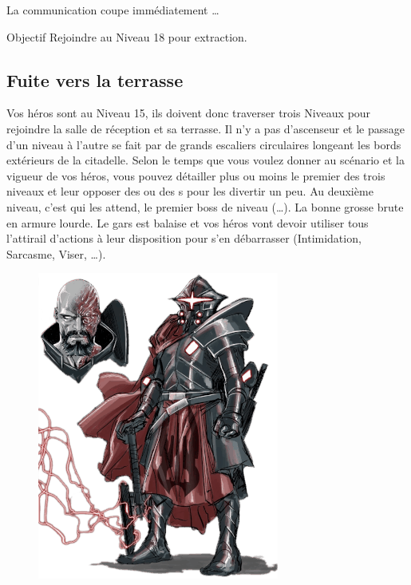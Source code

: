 La communication coupe immédiatement \dots

\begin{paperbox}{Objectif}
Rejoindre  au Niveau 18 pour extraction.
\end{paperbox}

\newpage

\subsection{Fuite vers la terrasse}

Vos héros sont au Niveau 15, ils doivent donc traverser trois Niveaux pour rejoindre la salle de réception et sa terrasse. Il n’y a pas d’ascenseur et le passage d’un niveau à l’autre se fait par de grands escaliers circulaires longeant les bords extérieurs de la citadelle. Selon le temps que vous voulez donner au scénario et la vigueur de vos héros, vous pouvez détailler plus ou moins le premier des trois niveaux et leur opposer des  ou des s pour les divertir un peu.
\bigbreak
Au deuxième niveau, c’est  qui les attend, le premier boss de niveau (\dots). La bonne grosse brute en armure lourde. Le gars est balaise et vos héros vont devoir utiliser tous l’attirail d’actions à leur disposition pour s’en débarrasser (Intimidation, Sarcasme, Viser, \dots).

\begin{figure}[h]
\noindent\includegraphics[width=\linewidth]{_img/pnjs/bombinax.png}
\caption{}
\end{figure}

